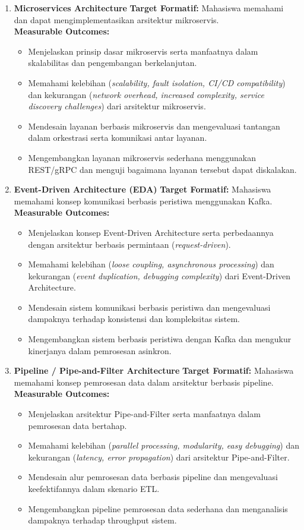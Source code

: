 \begin{enumerate}
\item \textbf{Microservices Architecture}  
\textbf{Target Formatif:} Mahasiswa memahami dan dapat mengimplementasikan arsitektur mikroservis.  \\
\textbf{Measurable Outcomes:}
\begin{itemize}
\item Menjelaskan prinsip dasar mikroservis serta manfaatnya dalam skalabilitas dan pengembangan berkelanjutan.
\item Memahami kelebihan (\textit{scalability, fault isolation, CI/CD compatibility}) dan kekurangan (\textit{network overhead, increased complexity, service discovery challenges}) dari arsitektur mikroservis.
\item Mendesain layanan berbasis mikroservis dan mengevaluasi tantangan dalam orkestrasi serta komunikasi antar layanan.
\item Mengembangkan layanan mikroservis sederhana menggunakan REST/gRPC dan menguji bagaimana layanan tersebut dapat diskalakan.
\end{itemize}

\item \textbf{Event-Driven Architecture (EDA)}  
\textbf{Target Formatif:} Mahasiswa memahami konsep komunikasi berbasis peristiwa menggunakan Kafka.  \\
\textbf{Measurable Outcomes:}
\begin{itemize}
\item Menjelaskan konsep Event-Driven Architecture serta perbedaannya dengan arsitektur berbasis permintaan (\textit{request-driven}).
\item Memahami kelebihan (\textit{loose coupling, asynchronous processing}) dan kekurangan (\textit{event duplication, debugging complexity}) dari Event-Driven Architecture.
\item Mendesain sistem komunikasi berbasis peristiwa dan mengevaluasi dampaknya terhadap konsistensi dan kompleksitas sistem.
\item Mengembangkan sistem berbasis peristiwa dengan Kafka dan mengukur kinerjanya dalam pemrosesan asinkron.
\end{itemize}

\item \textbf{Pipeline / Pipe-and-Filter Architecture}  
\textbf{Target Formatif:} Mahasiswa memahami konsep pemrosesan data dalam arsitektur berbasis pipeline.  \\
\textbf{Measurable Outcomes:}
\begin{itemize}
\item Menjelaskan arsitektur Pipe-and-Filter serta manfaatnya dalam pemrosesan data bertahap.
\item Memahami kelebihan (\textit{parallel processing, modularity, easy debugging}) dan kekurangan (\textit{latency, error propagation}) dari arsitektur Pipe-and-Filter.
\item Mendesain alur pemrosesan data berbasis pipeline dan mengevaluasi keefektifannya dalam skenario ETL.
\item Mengembangkan pipeline pemrosesan data sederhana dan menganalisis dampaknya terhadap throughput sistem.
\end{itemize}


\end{enumerate}
